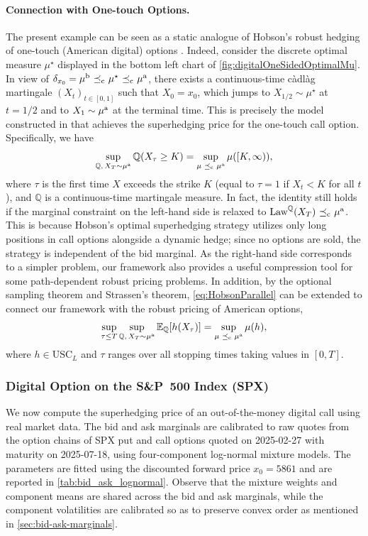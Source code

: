 \documentclass[11pt]{article}
\newcommand{\Q}{\mathbb{Q}} %
\theoremstyle{plain}
\theoremstyle{definition}
\theoremstyle{remark}
\newcommand{\E}{\mathbb{E}}
\DeclareMathOperator{\cleq}{\,\preceq_{\rm c}\,}
\theoremstyle{plain}
\begin{document}
\paragraph{Connection with One-touch Options.}
The present example can be seen as a static analogue of Hobson’s robust hedging of one-touch (American digital) options \cite{hobson2010skorokhod}. Indeed, consider the discrete optimal measure $\mu^{\star}$ displayed in the bottom left chart of \cref{fig:digitalOneSidedOptimalMu}. 
In view of $\delta_{x_0} = \mu^{\rm b}\cleq \mu^{\star} \cleq \mu^{\rm a}$, there exists a continuous-time càdlàg martingale $(X_t)_{t\in [0,1]}$ such that  $X_0 = x_0$, which jumps to $X_{1/2}\sim \mu^{\star}$ at $t=1/2$ and to $X_1\sim \mu^{\rm a}$ at the terminal time.  
This is precisely the model constructed in \cite{hobson2010skorokhod} that achieves the superhedging price for the one-touch call option. 
Specifically, we have
\begin{equation}\label{eq:HobsonParallel}
\sup_{\Q, \, X_T\sim  \mu^{\rm a}} \Q(X_\tau \ge K)
= \sup_{\mu \cleq \mu^{\rm a}} \mu([K, \infty)),
\end{equation}
where $\tau$ is the first time $X$ exceeds the strike $K$ (equal to $\tau = 1$ if $X_t< K$ for all $t$), and 
 $\Q$ is a continuous-time martingale measure. In fact, the identity  still holds if the marginal constraint on the left-hand side is relaxed to $\text{Law}^{\Q}(X_T)\cleq \mu^{\rm a}$. 
 This is because Hobson’s optimal superhedging strategy utilizes only long positions in call options alongside a dynamic hedge; since no options are sold, the strategy is independent of the bid marginal. 
As the right-hand side corresponds to a simpler problem, our framework also provides a useful compression tool for some path-dependent robust pricing problems. In addition, by the optional sampling theorem and Strassen's theorem, \eqref{eq:HobsonParallel} can be extended to connect our framework with the robust pricing of American options,
\begin{equation*}
\sup_{\tau \le T}\sup_{\Q,\, X_T\sim \mu^{\rm a}} \E_{\Q}[h(X_\tau)]
= \sup_{\mu \cleq \mu^{\rm a}} \mu(h),
\end{equation*}
where $h\in \text{USC}_L$ and $\tau$ ranges over all stopping times taking values in $[0,T]$.



\subsubsection{Digital Option on the S\&P~500 Index (SPX)}\label{subsec:digtial_spx}
We now compute the superhedging price of an out-of-the-money digital call using real market data. The bid and ask marginals are calibrated to raw quotes from the option chains of SPX put and call options quoted on 2025-02-27 with maturity on 2025-07-18, using four-component log-normal mixture models. The parameters are fitted using the discounted forward price $x_0=5861$ and are reported in \cref{tab:bid_ask_lognormal}. Observe that the mixture weights and component means are shared across the bid and ask marginals, while the component volatilities are calibrated so as to preserve convex order as mentioned in \cref{sec:bid-ask-marginals}.
\end{document}
